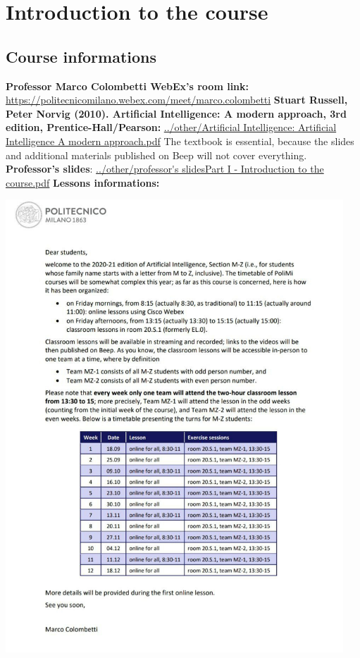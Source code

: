 \section{Introduction to the course}
\subsection{Course informations}
\textbf{Professor Marco Colombetti WebEx's room link:}\newline
\url{https://politecnicomilano.webex.com/meet/marco.colombetti}\newline
\newline
\textbf{Stuart Russell, Peter Norvig (2010). Artificial Intelligence: A modern approach, 3rd edition, Prentice-Hall/Pearson:}\newline
\url{../other/Artificial Intelligence: Artificial Intelligence A modern approach.pdf}\newline
The textbook is essential, because the slides and additional materials published on Beep will
not cover everything.\newline
\newline
\textbf{Professor's slides}:\newline
\url{../other/professor's slidesPart I - Introduction to the course.pdf}
\newline
\newline
\textbf{Lessons informations:}
\begin{center}
    \includegraphics[height=17cm]{../other/schedule.jpg}
\end{center}
